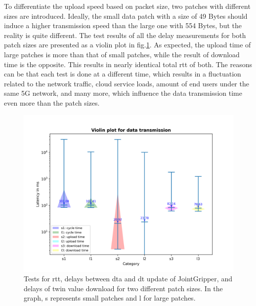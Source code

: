 To differentiate the upload speed based on packet size, two patches with 
different sizes are introduced. Ideally, the small data patch with a size of 
49 Bytes should induce a higher transmission speed than the large one with 554 Bytes, 
but the reality is quite different. The test results of all the 
delay measurements for both patch sizes are presented as a violin plot in 
fig.\ref{fig: UD-violin-patchsize}. As expected, the upload time of large 
patches is more than that of small patches, while the result of download time is 
the opposite. This results in nearly identical total \gls{rtt} of both. 
The reasons can be that each test is done at a different time, which results in a 
fluctuation related to the network traffic, cloud service loads, amount of end users 
under the same 5G network, and many more, which influence the data transmission time 
even more than the patch sizes.

\begin{figure}[htb]
    \centering
    \includegraphics[width=\textwidth]{figures/tests/DT/violin_patch_size.png}
    \caption{Tests for \gls{rtt}, delays between \gls{dta} and \gls{dt} 
    update of JointGripper, and delays of twin value download for 
    two different patch sizes. In the graph, s represents small patches 
    and l for large patches.\label{fig: UD-violin-patchsize}}
\end{figure}

